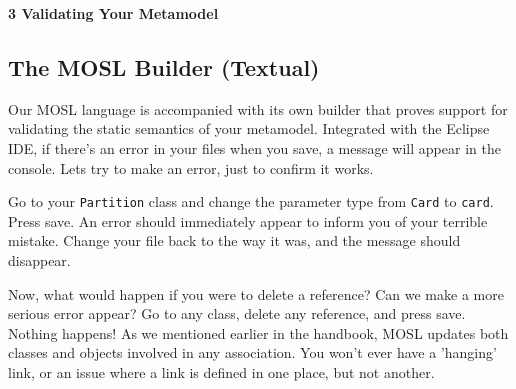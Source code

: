 \newpage
\texHeader

{\bf \Large 3 \hspace{0.5cm}Validating Your Metamodel}

\subsection{ The MOSL Builder (Textual)}

\hypertarget{validation tex}{} Our MOSL language is accompanied with its own builder that proves support for validating the static semantics of your metamodel. Integrated with the Eclipse IDE, if there's an error in your files when you save, a message will appear in the console. Lets try to make an error, just to confirm it works.

Go to your \texttt{Partition} class and change the parameter type from \texttt{Card} to \texttt{card}. Press save. An error should immediately appear to inform you of your terrible mistake. Change your file back to the way it was, and the message should disappear.

Now, what would happen if you were to delete a reference? Can we make a more serious error appear? Go to any class, delete any reference, and press save. Nothing happens! As we mentioned earlier in the handbook, MOSL updates both classes and objects involved in any association. You won't ever have a 'hanging' link, or an issue where a link is defined in one place, but not another. 

